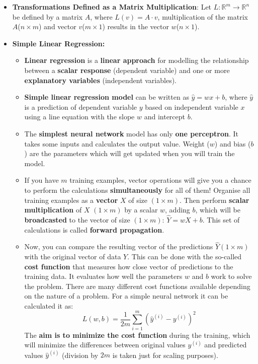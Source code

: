 \documentclass[16pt]{article}
\begin{document}
\begin{itemize}
	\item \textbf{Transformations Defined as a Matrix Multiplication}: Let $L: \mathbb{R}^m \to \mathbb{R}^n$ be defined by a matrix $A$, where $L(v) = A \cdot v$, multiplication of the matrix $A$($n \times m$) and vector $v$($m \times 1$) results in the vector $w$($n \times 1$).
	\item \textbf{Simple Linear Regression:}
	\begin{itemize}
		\item \textbf{Linear regression} is a \textbf{linear approach} for modelling the relationship between a \textbf{scalar response} (dependent variable) and one or more \textbf{explanatory variables} (independent variables).
		\item \textbf{Simple linear regression model} can be written as $\hat{y} = wx + b$, where $\hat{y}$ is a prediction of dependent variable $y$ based on independent variable $x$ using a line equation with the slope $w$ and intercept $b$.
		\item The \textbf{simplest neural network} model has only \textbf{one perceptron}. It takes some inputs and calculates the output value. Weight ($w$) and bias ($b$) are the parameters which will get updated when you will train the model.
		\item If you have $m$ training examples, vector operations will give you a chance to perform the calculations \textbf{simultaneously} for all of them! Organise all training examples as a \textbf{vector} $X$ of size $(1\times m)$. Then perform \textbf{scalar multiplication} of $X$ $(1\times m)$ by a scalar $w$, adding $b$, which will be \textbf{broadcasted} to the vector of size $(1\times m)$: $\hat{Y} = wX + b$. This set of calculations is called \textbf{forward propagation}.
		\item Now, you can compare the resulting vector of the predictions $\hat{Y}$$(1\times m)$ with the original vector of data $Y$. This can be done with the so-called \textbf{cost function} that measures how close vector of predictions to the training data. It evaluates how well the parameters $w$ and $b$ work to solve the problem. There are many different cost functions available depending on the nature of a problem. For a simple neural network it can be calculated it as:
		\begin{equation*}
			L(w, b) = \frac{1}{2m} \sum_{i=1}^{m} (\hat{y}^{(i)} - y^{(i)})^2
		\end{equation*}
		The \textbf{aim is to minimize the cost function} during the training, which will minimize the differences between original values $y^{(i)}$ and predicted values $\hat{y}^{(i)}$ (division by $2m$ is taken just for scaling purposes).
$$
\end{itemize}
\end{itemize}
\end{document}

